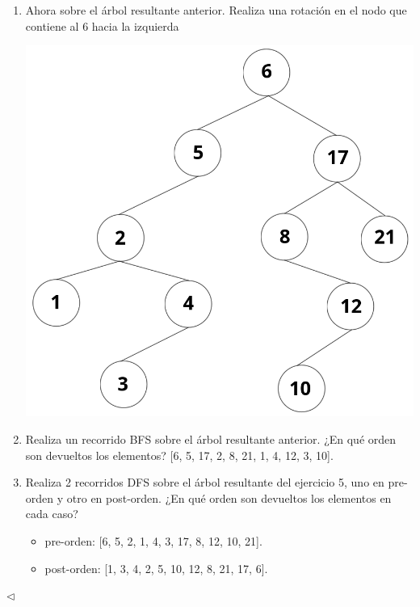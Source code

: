 \begin{enumerate}
\begin{center}
       \end{center}
       \item Ahora sobre el árbol resultante anterior. Realiza una rotación en el nodo que contiene
       al 6 hacia la izquierda
       \begin{center}
          \includegraphics[scale=0.19]{../Image/RI.png}
       \end{center}
       \item Realiza un recorrido BFS sobre el árbol resultante anterior.
       ¿En qué orden son devueltos los elementos? [6, 5, 17, 2, 8, 21, 1, 4, 12, 3, 10].
       \item Realiza 2 recorridos DFS sobre el árbol resultante del ejercicio 5,
       uno en pre-orden y otro en post-orden. ¿En qué orden son devueltos los elementos en cada caso?
       \newcommand{\localtextbulletone}{\textcolor{gray}{\raisebox{.45ex}{\rule{.6ex}{.6ex}}}}
       \renewcommand{\labelitemi}{\localtextbulletone}
       \begin{itemize}
       \item pre-orden: [6, 5, 2, 1, 4, 3, 17, 8, 12, 10, 21].
       \item post-orden: [1, 3, 4, 2, 5, 10, 12, 8, 21, 17, 6].
       \end{itemize}
    \end{enumerate}

\hfill $\lhd$
